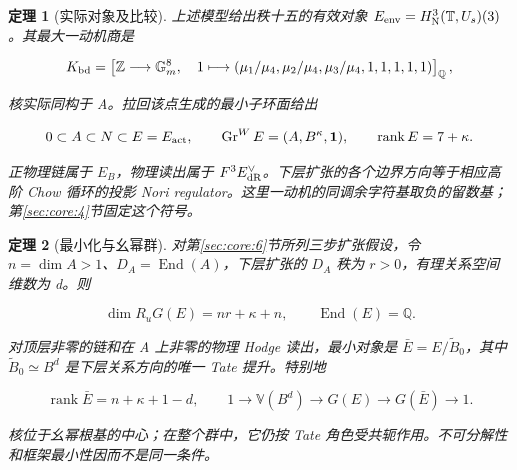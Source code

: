 \documentclass[11pt,a4paper,oneside]{ctexart}
\theoremstyle{cnplain}
\newtheorem{theorem}{定理}[section]
\theoremstyle{definition}
\theoremstyle{remark}
\numberwithin{equation}{section}
\begin{document}
\begin{theorem}[实际对象及比较]

\label{thm:core:A} 上述模型给出秩十五的有效对象 \(E_{\rm env}=H^3_{\rm N}(\mathbb T,U_s)(3)\)。其最大一动机商是

\begin{equation}
K_{\rm bd}=\left[\mathbb Z\longrightarrow\mathbb G_m^8,\quad
 1\longmapsto(\mu_1/\mu_4,\mu_2/\mu_4,\mu_3/\mu_4,1,1,1,1,1)\right]_{\mathbb Q},
                                                               \label{eq:core:1.4}
\end{equation}

核实际同构于 A。拉回该点生成的最小子环面给出

\begin{equation}
0\subset A\subset N\subset E=E_{\rm act},\qquad
 \operatorname{Gr}^W E=(A,B^\kappa,\mathbf1),\qquad
 \operatorname{rank}E=7+\kappa.                           \label{eq:core:1.5}
\end{equation}

正物理链属于 \(E_B\)，物理读出属于 \(F^3E_{\rm dR}^{\vee}\)。下层扩张的各个边界方向等于相应高阶 Chow 循环的投影 Nori regulator。这里一动机的同调余字符基取负的留数基；第\ref{sec:core:4}节固定这个符号。

\end{theorem}

\begin{theorem}[最小化与幺幂群]

\label{thm:core:B} 对第\ref{sec:core:6}节所列三步扩张假设，令 \(n=\dim A>1\)、\(D_A=\operatorname{End}(A)\)，下层扩张的 \(D_A\) 秩为 \(r>0\)，有理关系空间维数为 d。则

\begin{equation}
\dim R_uG(E)=nr+\kappa+n,\qquad
 \operatorname{End}(E)=\mathbb Q.                         \label{eq:core:1.6}
\end{equation}

对顶层非零的链和在 A 上非零的物理 Hodge 读出，最小对象是 \(\bar E=E/\widetilde B_0\)，其中 \(\widetilde B_0\simeq B^d\) 是下层关系方向的唯一 Tate 提升。特别地

\begin{equation}
\operatorname{rank}\bar E=n+\kappa+1-d,
 \qquad 1\longrightarrow\mathbb V(B^d)
 \longrightarrow G(E)\longrightarrow G(\bar E)\longrightarrow1. \label{eq:core:1.7}
\end{equation}

核位于幺幂根基的中心；在整个群中，它仍按 Tate 角色受共轭作用。不可分解性和框架最小性因而不是同一条件。

\end{theorem}
\end{document}
